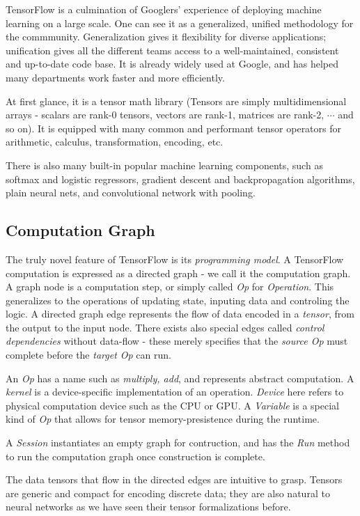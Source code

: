\documentclass[12pt]{article}  %
\begin{document}
TensorFlow is a culmination of Googlers' experience of deploying machine learning on a large scale. One can see it as a generalized, unified methodology for the commmunity. Generalization gives it flexibility for diverse applications; unification gives all the different teams access to a well-maintained, consistent and up-to-date code base. It is already widely used at Google, and has helped many departments work faster and more efficiently.

At first glance, it is a tensor math library (Tensors are simply multidimensional arrays - scalars are rank-0 tensors, vectors are rank-1, matrices are rank-2, $\cdots$ and so on). It is equipped with many common and performant tensor operators for arithmetic, calculus, transformation, encoding, etc.

There is also many built-in popular machine learning components, such as softmax and logistic regressors, gradient descent and backpropagation algorithms, plain neural nets, and convolutional network with pooling.

\subsection{Computation Graph}

The truly novel feature of TensorFlow is its \emph{programming model}. A TensorFlow computation is expressed as a directed graph - we call it the computation graph. A graph node is a computation step, or simply called \emph{Op} for \emph{Operation}. This generalizes to the operations of updating state, inputing data and controling the logic. A directed graph edge represents the flow of data encoded in a \emph{tensor}, from the output to the input node. There exists also special edges called \emph{control dependencies} without data-flow - these merely specifies that the \emph{source Op} must complete before the \emph{target Op} can run.

An \emph{Op} has a name such as \emph{multiply, add}, and represents abstract computation. A \emph{kernel} is a device-specific implementation of an operation. \emph{Device} here refers to physical computation device such as the CPU or GPU. A \emph{Variable} is a special kind of \emph{Op} that allows for tensor memory-presistence during the runtime.

A \emph{Session} instantiates an empty graph for contruction, and has the \emph{Run} method to run the computation graph once construction is complete.

The data tensors that flow in the directed edges are intuitive to grasp. Tensors are generic and compact for encoding discrete data; they are also natural to neural networks as we have seen their tensor formalizations before.
\end{document}
